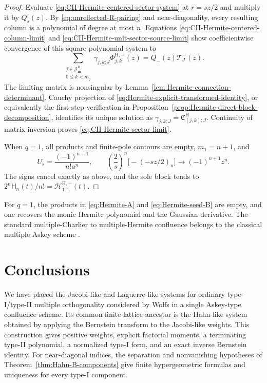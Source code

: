 \documentclass[10pt]{amsart}
\newcommand{\mm}{\boldsymbol m}
\theoremstyle{plain}
\theoremstyle{definition}
\theoremstyle{remark}
\begin{document}
\begin{proof}
Evaluate \eqref{eq:CII-Hermite-centered-sector-system} at \(r=sz/2\)
and multiply it by \(Q_s(z)\).  By
\eqref{eq:unreflected-R-pairing} and near-diagonality, every resulting
column is a polynomial of degree at most \(n\).  Equations
\eqref{eq:CII-Hermite-centered-column-limit} and
\eqref{eq:CII-Hermite-unit-sector-source-limit} show coefficientwise
convergence of this square polynomial system to
\[
 \sum_{\substack{j\in\mathcal J_{\mm}^{\mathrm H}\\0\le k<m_j}}
 \gamma_{j,k;J}\Phi_{j,k}^{\mathrm H,-}(z)
 =Q_-(z)\mathcal T_J^-(z).
\]
The limiting matrix is nonsingular by
Lemma~\ref{lem:Hermite-connection-determinant}.  Cauchy projection of
\eqref{eq:Hermite-explicit-transformed-identity}, or equivalently the
first-step verification in
Proposition~\ref{prop:Hermite-direct-block-decomposition}, identifies
its unique solution as
\(\gamma_{j,k;J}=\mathfrak C_{(j,k);J}^{\mathrm H}\).
Continuity of matrix inversion proves
\eqref{eq:CII-Hermite-sector-limit}.

When \(q=1\), all products and finite-pole contours are empty,
\(m_1=n+1\), and
\[
 U_s=\frac{(-1)^{n+1}}{n!a^n},\qquad
 \left(\frac2s\right)^n
 \bigl[-(-sz/2)_n\bigr]\longrightarrow(-1)^{n+1}z^n.
\]
The signs cancel exactly as above, and the sole block tends to
\(2^n\mathsf H_n(t)/n!=\mathscr H_{1,1}^{\mathrm H,-}(t)\).
\end{proof}

For \(q=1\), the products in \eqref{eq:Hermite-A} and
\eqref{eq:Hermite-seed-B} are empty, and one recovers the monic Hermite
polynomial and the Gaussian derivative. The standard multiple-Charlier
to multiple-Hermite confluence belongs to the classical multiple Askey scheme
\cite{BranquinhoDiazFoulquieManasWolfs2024Discrete}.


\section{Conclusions}
\label{sec:conclusions}

We have placed the Jacobi-like and Laguerre-like systems for ordinary
type-I/type-II multiple orthogonality considered by Wolfs in a single
Askey-type confluence scheme. Its common finite-lattice ancestor is the
Hahn-like system obtained by applying the Bernstein transform to the
Jacobi-like weights. This construction gives positive weights, explicit
factorial moments, a terminating type-II polynomial, a normalized type-I
form, and an exact inverse Bernstein identity. For near-diagonal indices,
the separation and nonvanishing hypotheses of
Theorem~\ref{thm:Hahn-B-components} give finite hypergeometric formulas
and uniqueness for every type-I component.
\end{document}
